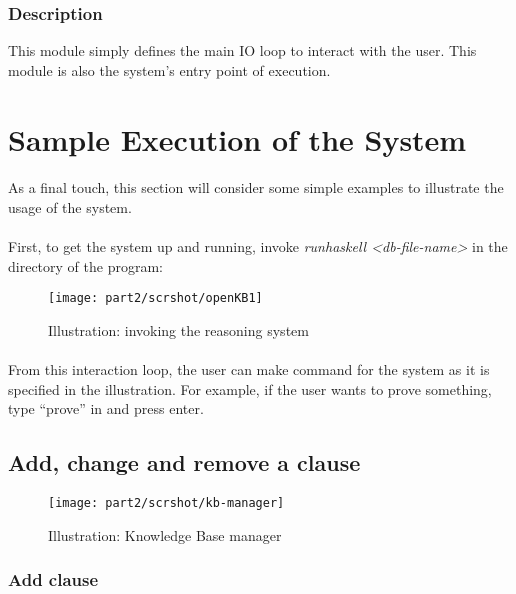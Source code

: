 \documentclass[../gr-final.tex]{subfiles}
\begin{document}
\subsubsection{Description}
This module simply defines the main IO loop to interact with the
user. This module is also the system's entry point of execution.

\section{Sample Execution of the System}
\paragraph{} As a final touch, this section will consider some
simple examples to illustrate the usage of the system.
\paragraph{} First, to get the system up and running, invoke {\em
runhaskell <db-file-name>} in the directory of the program:
\begin{figure}[H]
  \centering
  \texttt{[image: part2/scrshot/openKB1]}
  \caption{Illustration: invoking the reasoning system}
\end{figure}
\paragraph{} From this interaction loop, the user can make
command for the system as it is specified in the illustration.
For example, if the user wants to prove something, type ``prove'' in and press
enter. 
\subsection{Add, change and remove a clause}

\begin{figure}[H]
  \centering
  \texttt{[image: part2/scrshot/kb-manager]}
  \caption{Illustration: Knowledge Base manager}
\end{figure}

\subsubsection{Add clause} 
\end{document}
